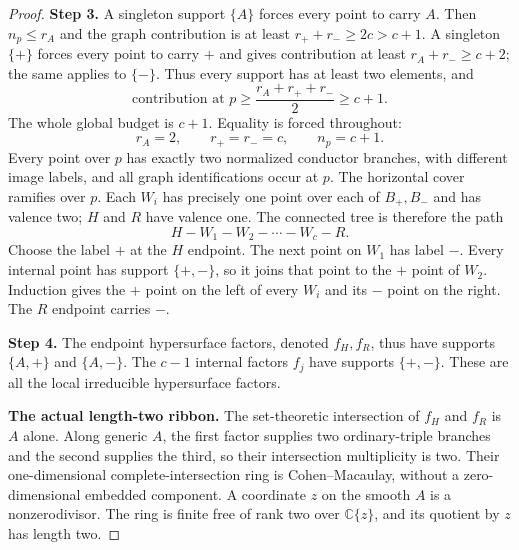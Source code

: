 \begin{proof}
\noindent\textbf{Step 3.} A singleton support $\{A\}$ forces every point to
carry $A$. Then $n_p\le r_A$ and the graph
contribution is at least $r_++r_-\ge2c>c+1$.
A singleton $\{+\}$ forces every point to carry
$+$ and gives contribution at least
$r_A+r_-\ge c+2$; the same applies to $\{-\}$.
Thus every support has at least two elements, and
\[
 \text{contribution at }p
       \ge\frac{r_A+r_++r_-}{2}\ge c+1.
\]
The whole global budget is $c+1$. Equality is
forced throughout:
\[
                 r_A=2,\qquad r_+=r_-=c,\qquad n_p=c+1.
                                                               \tag{R20.2}
\]
Every point over $p$ has exactly two normalized
conductor branches, with different image labels,
and all graph identifications occur at $p$.
The horizontal cover ramifies over $p$.
Each $W_i$ has precisely one point over each of
$B_+,B_-$ and has valence two; $H$ and $R$ have
valence one. The connected tree is therefore
the path
\[
                    H-W_1-W_2-\cdots-W_c-R.             \tag{R20.3}
\]
Choose the label $+$ at the $H$ endpoint. The next
point on $W_1$ has label $-$. Every internal point
has support $\{+,-\}$, so it joins that point to
the $+$ point of $W_2$. Induction gives the $+$
point on the left of every $W_i$ and its $-$
point on the right. The $R$ endpoint carries $-$.

\noindent\textbf{Step 4.} The endpoint hypersurface factors, denoted
$f_H,f_R$, thus have supports $\{A,+\}$ and
$\{A,-\}$. The $c-1$ internal factors $f_j$
have supports $\{+,-\}$. These are all the local
irreducible hypersurface factors.

\par\medskip\noindent\textbf{The actual length-two ribbon.}
The set-theoretic intersection of $f_H$ and $f_R$
is $A$ alone. Along generic $A$, the first factor
supplies two ordinary-triple branches and the
second supplies the third, so their intersection
multiplicity is two. Their one-dimensional
complete-intersection ring is Cohen--Macaulay,
without a zero-dimensional embedded component.
A coordinate $z$ on the smooth $A$ is a
nonzerodivisor. The ring is finite free of rank
two over $\mathbb C\{z\}$, and its quotient by
$z$ has length two.


\end{proof}
